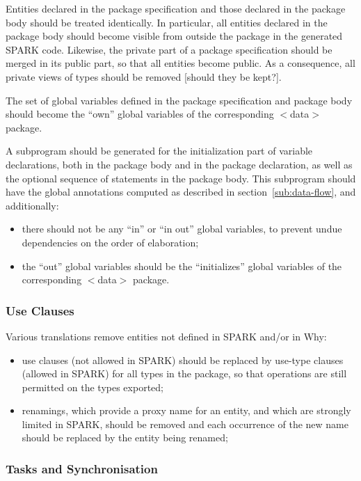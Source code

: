\documentclass[fullpage]{article}
\begin{document}
Entities declared in the package specification and those declared in the
package body should be treated identically. In particular, all entities
declared in the package body should become visible from outside the package in
the generated SPARK code. Likewise, the private part of a package specification
should be merged in its public part, so that all entities become public. As a
consequence, all private views of types should be removed [should they be
kept?].

The set of global variables defined in the package specification and package
body should become the ``own'' global variables of the corresponding $<$data$>$
package.

A subprogram should be generated for the initialization part of variable
declarations, both in the package body and in the package declaration, as well
as the optional sequence of statements in the package body. This subprogram
should have the global annotations computed as described in
section~\ref{sub:data-flow}, and additionally:
\begin{itemize}
\item there should not be any ``in'' or ``in out'' global variables, to prevent
  undue dependencies on the order of elaboration;
\item the ``out'' global variables should be the ``initializes'' global
  variables of the corresponding $<$data$>$ package.
\end{itemize}

\subsubsection{Use Clauses}

Various translations remove entities not defined in SPARK and/or in Why:
\begin{itemize}
\item use clauses (not allowed in SPARK) should be replaced by use-type clauses
  (allowed in SPARK) for all types in the package, so that operations are still
  permitted on the types exported;
\item renamings, which provide a proxy name for an entity, and which are
  strongly limited in SPARK, should be removed and each occurrence of the
  new name should be replaced by the entity being renamed;
\end{itemize}

\subsubsection{Tasks and Synchronisation}
\end{document}
